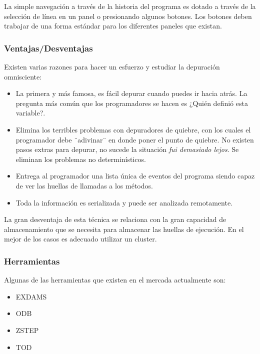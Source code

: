 \documentclass[12pt,legalpaper]{report}
\begin{document}
La simple navegación a través de la historia del programa es dotado a través de la selección de línea en un panel o presionando algunos botones.  Los botones deben trabajar de una forma estándar para los diferentes paneles que existan.


			\subsubsection{Ventajas/Desventajas}

Existen varias razones para hacer un esfuerzo y estudiar la depuración omnisciente:

\begin{itemize}
	\item La primera y más famosa, es fácil depurar cuando puedes ir hacia atrás.  La pregunta más común que los programadores se hacen es ¿Quién definió esta variable?.

	\item Elimina los terribles problemas con depuradores de quiebre, con los cuales el programador debe ¨adivinar¨ en donde poner el punto de quiebre.  No existen pasos extras para depurar, no sucede la situación \textit{fui demasiado lejos}.  Se eliminan los problemas no determinísticos.

	\item Entrega al programador una lista única de eventos del programa siendo capaz de ver las huellas de llamadas a los métodos.

	\item Toda la información es serializada y puede ser analizada remotamente.
\end{itemize}

La gran desventaja de esta técnica se relaciona con la gran capacidad de almacenamiento que se necesita para almacenar las huellas de ejecución.  En el mejor de los casos es adecuado utilizar un cluster.

			\subsubsection{Herramientas}

Algunas de las herramientas que existen en el mercada actualmente son:
\begin{itemize}
	\item EXDAMS
	\item ODB
	\item ZSTEP
	\item TOD
\end{itemize}
\end{document}
